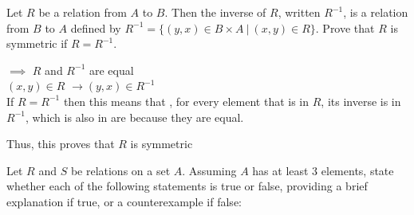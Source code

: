 \documentclass[addpoints]{exam}
\begin{document}
\begin{questions}
\begin{parts}
\end{parts}

\question Let $R$ be a relation from $A$ to $B$. Then the inverse of $R$, written $R^{-1}$, is a relation from $B$ to $A$ defined by $R^{-1} = \{(y,x) \in B \times A \:|\: (x,y) \in R\}$. Prove that $R$ is symmetric if $R = R^{-1}$.

  \begin{solution}
    
    $\implies$ $R$ and $R^{-1}$ are equal    
     \\ $(x,y) \in R$ $\rightarrow (y,x) \in R^{-1}$    
    \\If $R = R^{-1}$ then this means that , for every element
    that is in $R$, its inverse is in $R^{-1}$, which is also in are because they are equal.
    
    Thus, this proves that $R$ is symmetric
    
    
    
  \end{solution}

\question Let $R$ and $S$ be relations on a set $A$. Assuming $A$ has at least 3 elements, state whether each of the following statements is true or false, providing a brief explanation if true, or a counterexample if false:



\end{questions}
\end{document}
